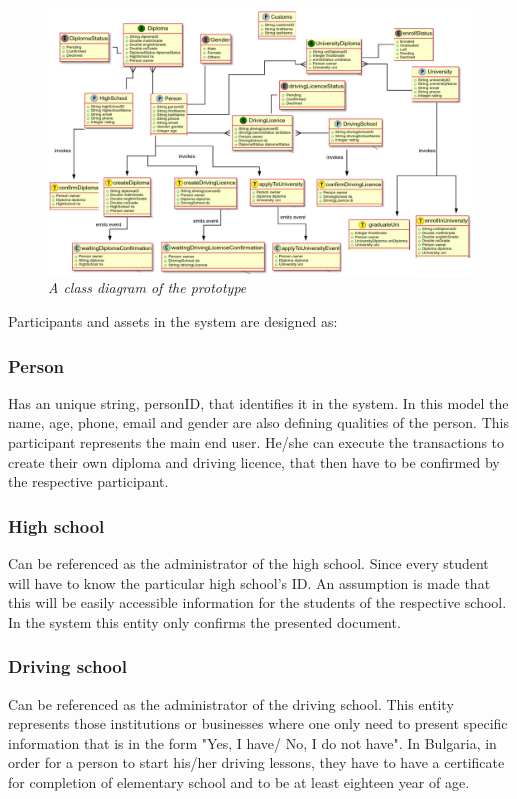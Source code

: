\documentclass[a4paper,11pt]{report}
\begin{document}
\begin{figure}[h]
\centering
  \includegraphics[width=16cm]{classDiagram.png}
  \caption{\textit{A class diagram of the prototype}}
  \label{classDiagram}
\end{figure}


Participants and assets in the system are designed as:

\subsubsection{Person}
Has an unique string, personID, that identifies it in the system. In this model the name, age, phone, email and gender are also defining qualities of the person. This participant represents the main end user. He/she can execute the transactions to create their own diploma and driving licence, that then have to be confirmed by the respective participant.   

\subsubsection{High school}
Can be referenced as the administrator of the high school. Since every student will have to know the particular high school's ID. An assumption is made that this will be easily accessible information for the students of the respective school. In the system this entity only confirms the presented document. 

\subsubsection{Driving school}	
Can be referenced as the administrator of the driving school. This entity represents those institutions or businesses where one only need to present specific information that is in the form "Yes, I have/ No, I do not have". In Bulgaria, in order for a person to start his/her driving lessons, they have to have a certificate for completion of elementary school and to be at least eighteen year of age. 
	
\end{document}
